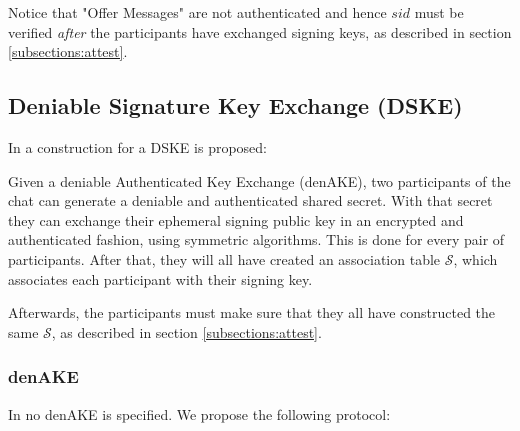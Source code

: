 Notice that "Offer Messages" are not authenticated and hence $sid$ must be verified \emph{after} the participants have exchanged signing keys, as described in section \ref{subsections:attest}.


\subsection{Deniable Signature Key Exchange (DSKE)}
\label{subsections:DSKE}
In \cite{mpotr} a construction for a DSKE is proposed:

Given a deniable Authenticated Key Exchange (denAKE), two participants of the chat can generate a deniable and authenticated shared secret. With that secret they can exchange their ephemeral signing public key in an encrypted and authenticated fashion, using symmetric algorithms. This is done for every pair of participants. After that, they will all have created an association table $\mathcal{S}$, which associates each participant with their signing key.

Afterwards, the participants must make sure that they all have constructed the same $\mathcal{S}$, as described in section \ref{subsections:attest}.

\subsubsection{denAKE}
In \cite{mpotr} no denAKE is specified. We propose the following protocol:

